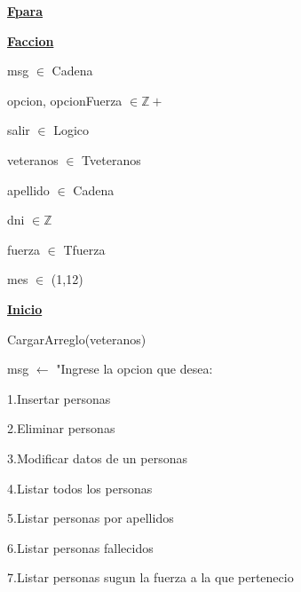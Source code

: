 \documentclass{article}
\begin{document}
            \hspace{12mm}\underline{\textbf{Fpara}}
    
    \hspace{4mm}\underline{\textbf{Faccion}}

    \vspace{4mm}

    \hspace{4mm}msg $\in$ Cadena

    \hspace{4mm}opcion, opcionFuerza $\in \mathbb{Z+}$

    \hspace{4mm}salir $\in$ Logico

    \hspace{4mm}veteranos $\in$ Tveteranos

    \hspace{4mm}apellido $\in$ Cadena

    \hspace{4mm}dni $\in \mathbb{Z}$

    \hspace{4mm}fuerza $\in$ Tfuerza

    \hspace{4mm}mes $\in$ (1,12)

    \vspace{4mm}

    \underline{\textbf{Inicio}}

    \hspace{4mm}CargarArreglo(veteranos)

    \hspace{4mm}msg $\leftarrow$ "Ingrese la opcion que desea: 

        \hspace{17mm}1.Insertar personas

        \hspace{17mm}2.Eliminar personas

        \hspace{17mm}3.Modificar datos de un personas

        \hspace{17mm}4.Listar todos los personas

        \hspace{17mm}5.Listar personas por apellidos

        \hspace{17mm}6.Listar personas fallecidos

        \hspace{17mm}7.Listar personas sugun la fuerza a la que pertenecio
\end{document}
